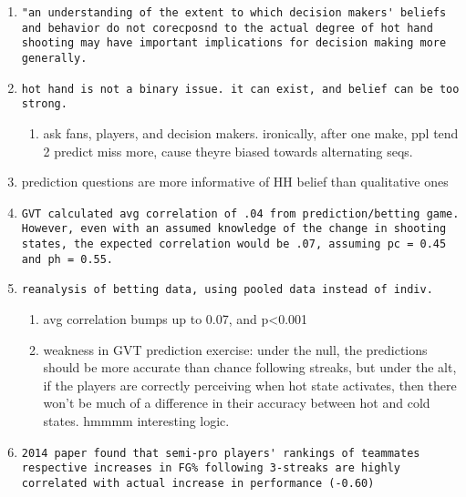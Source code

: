 \documentclass[12pt,twoside]{dukestatscithesis}
\providecommand{\tightlist}{%
  \setlength{\itemsep}{0pt}\setlength{\parskip}{0pt}}
\theoremstyle{definition}
\theoremstyle{definition}
\theoremstyle{definition}
\theoremstyle{remark}
\begin{document}
\begin{enumerate}
\begin{enumerate}
  \item
\begin{verbatim}
"an understanding of the extent to which decision makers' beliefs and behavior do not corecposnd to the actual degree of hot hand shooting may have important implications for decision making more generally.
\end{verbatim}
  \item
\begin{verbatim}
hot hand is not a binary issue. it can exist, and belief can be too strong.
\end{verbatim}
    \begin{enumerate}
    \def\labelenumiii{\roman{enumiii}.}
    \tightlist
    \item
      ask fans, players, and decision makers. ironically, after one
      make, ppl tend 2 predict miss more, cause theyre biased towards
      alternating seqs.
    \end{enumerate}
  \item
    prediction questions are more informative of HH belief than
    qualitative ones
  \item
\begin{verbatim}
GVT calculated avg correlation of .04 from prediction/betting game. However, even with an assumed knowledge of the change in shooting states, the expected correlation would be .07, assuming pc = 0.45 and ph = 0.55.
\end{verbatim}
  \item
\begin{verbatim}
reanalysis of betting data, using pooled data instead of indiv.
\end{verbatim}
    \begin{enumerate}
    \def\labelenumiii{\roman{enumiii}.}
    \tightlist
    \item
      avg correlation bumps up to 0.07, and p\textless{}0.001
    \item
      weakness in GVT prediction exercise: under the null, the
      predictions should be more accurate than chance following streaks,
      but under the alt, if the players are correctly perceiving when
      hot state activates, then there won't be much of a difference in
      their accuracy between hot and cold states. hmmmm interesting
      logic.
    \end{enumerate}
  \item
\begin{verbatim}
2014 paper found that semi-pro players' rankings of teammates respective increases in FG% following 3-streaks are highly correlated with actual increase in performance (-0.60)

\end{verbatim}
\end{enumerate}
\end{enumerate}
\end{document}
